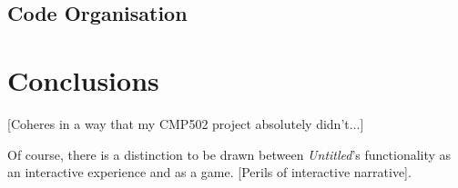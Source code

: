 \documentclass[a4paper, 11pt]{article}
\begin{document}
\begin{flushleft}
\subsection{Code Organisation}

\section{Conclusions}

[Coheres in a way that my CMP502 project absolutely didn't...]

\vspace{5pt}\noindent
Of course, there is a distinction to be drawn between \textit{Untitled}'s functionality as an interactive experience and as a game. [Perils of interactive narrative].

\vspace{5pt}



\end{flushleft}
\end{document}
